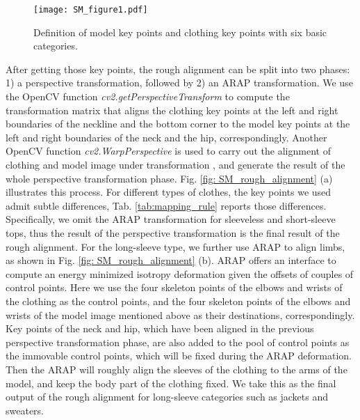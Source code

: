 \documentclass[10pt,twocolumn,letterpaper]{article}
\begin{document}
\begin{figure}[h]
  \centering
  \texttt{[image: SM\_figure1.pdf]}
  \caption{Definition of model key points and clothing key points with six basic categories.}\label{fig: SM_keypoints_model_cloth}
\end{figure}


After getting those key points, the rough alignment can be split into two phases: 1) a perspective transformation, followed by 2) an ARAP transformation. We use the OpenCV function \textit{cv2.getPerspectiveTransform} to compute the transformation matrix  that aligns the clothing key points at the left and right boundaries of the neckline and the bottom corner to the model key points at the left and right boundaries of the neck and the hip, correspondingly. Another OpenCV function \textit{cv2.WarpPerspective} is used to carry out the alignment of clothing and model image under transformation , and generate the result of the whole perspective transformation phase.
Fig. \ref{fig: SM_rough_alignment} (a) illustrates this process. For different types of clothes, the key points we used admit subtle differences, Tab. \ref{tab:mapping_rule} reports those differences. Specifically, we omit the ARAP transformation for sleeveless and short-sleeve tops, thus the result of the perspective transformation is the final result of the rough alignment. For the long-sleeve type, we further use ARAP to align limbs, as shown in Fig. \ref{fig: SM_rough_alignment} (b). ARAP offers an interface to compute an energy minimized isotropy deformation given the offsets of couples of control points. Here we use the four skeleton points of the elbows and wrists of the clothing as the control points, and the four skeleton points of the elbows and wrists of the model image mentioned above as their destinations, correspondingly. Key points of the neck and hip, which have been aligned in the previous perspective transformation phase, are also added to the pool of control points as the immovable control points, which will be fixed during the ARAP deformation. Then the ARAP will roughly align the sleeves of the clothing to the arms of the model, and keep the body part of the clothing fixed. We take this as the final output of the rough alignment for long-sleeve categories such as jackets and sweaters.
\end{document}
